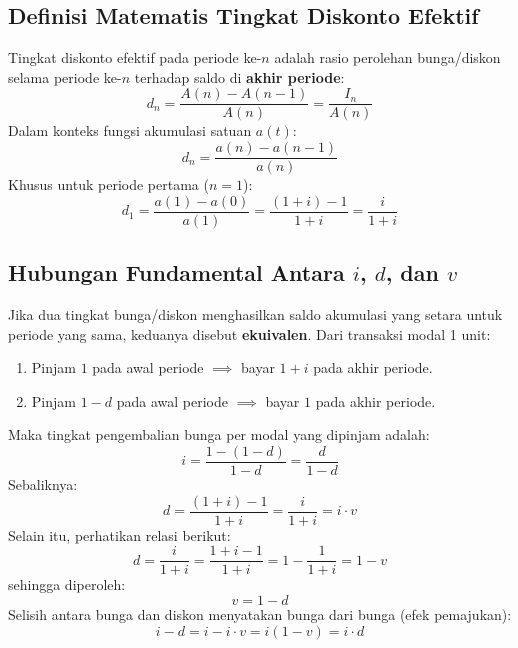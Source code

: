 \documentclass[11pt,a4paper]{article}
\begin{document}
\subsection{Definisi Matematis Tingkat Diskonto Efektif}
\begin{definitionbox}
Tingkat diskonto efektif pada periode ke-$n$ adalah rasio perolehan bunga/diskon selama periode ke-$n$ terhadap saldo di \textbf{akhir periode}:
\begin{equation}
    d_n = \frac{A(n) - A(n-1)}{A(n)} = \frac{I_n}{A(n)}
\end{equation}
Dalam konteks fungsi akumulasi satuan $a(t)$:
\begin{equation}
    d_n = \frac{a(n) - a(n-1)}{a(n)}
\end{equation}
Khusus untuk periode pertama ($n=1$):
\begin{equation}
    d_1 = \frac{a(1) - a(0)}{a(1)} = \frac{(1+i) - 1}{1+i} = \frac{i}{1+i}
\end{equation}
\end{definitionbox}

\subsection{Hubungan Fundamental Antara $i$, $d$, dan $v$}
Jika dua tingkat bunga/diskon menghasilkan saldo akumulasi yang setara untuk periode yang sama, keduanya disebut \textbf{ekuivalen}.
Dari transaksi modal 1 unit:
\begin{enumerate}[leftmargin=1.5em]
    \item Pinjam $1$ pada awal periode $\implies$ bayar $1 + i$ pada akhir periode.
    \item Pinjam $1 - d$ pada awal periode $\implies$ bayar $1$ pada akhir periode.
\end{enumerate}
Maka tingkat pengembalian bunga per modal yang dipinjam adalah:
\begin{equation}
    i = \frac{1 - (1 - d)}{1 - d} = \frac{d}{1 - d}
\end{equation}
Sebaliknya:
\begin{equation}
    d = \frac{(1 + i) - 1}{1 + i} = \frac{i}{1 + i} = i \cdot v
\end{equation}
Selain itu, perhatikan relasi berikut:
\begin{equation}
    d = \frac{i}{1+i} = \frac{1+i-1}{1+i} = 1 - \frac{1}{1+i} = 1 - v
\end{equation}
sehingga diperoleh:
\begin{equation}
    v = 1 - d
\end{equation}
Selisih antara bunga dan diskon menyatakan bunga dari bunga (efek pemajukan):
\begin{equation}
    i - d = i - i \cdot v = i(1 - v) = i \cdot d
\end{equation}
\end{document}
